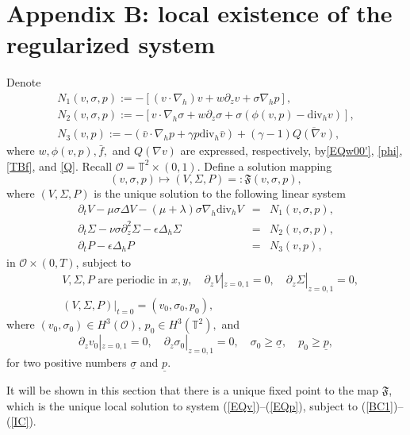 \documentclass[12pt,reqno]{amsart}
\numberwithin{equation}{section}
\begin{document}
\section{Appendix B: local existence of the regularized system}
\label{APPENDIXB}
Denote
\begin{eqnarray*}
  N_1(v,\sigma,p):=-[(v\cdot\nabla_h)v+w\partial_zv+\sigma\nabla_hp],\label{N1}\\
  N_2(v,\sigma,p):=-[v\cdot\nabla_h\sigma+w\partial_z\sigma+\sigma(\phi(v,p)-\text{div}_hv)],\label{N2}\\
  N_3(v,p):=-(\bar v\cdot\nabla_hp+\gamma p\text{div}_h\bar v)+(\gamma-1)\overline{Q(\nabla v)},\label{N3}
\end{eqnarray*}
where $w, \phi(v,p), \bar f,$ and $Q(\nabla v)$ are expressed, respectively, by\eqref{EQw00'}, \eqref{phi}, \eqref{TBf}, and \eqref{Q}.
Recall $\mathcal O=\mathbb T^2\times(0,1)$. Define a solution mapping
\begin{equation}\label{DEFF}
(v,\sigma,p)\mapsto(V,\Sigma,P)=:\mathfrak{F}(v,\sigma,p),
\end{equation}
where $(V,\Sigma,P)$ is the unique solution to the following linear system
\begin{eqnarray}
  \partial_tV-\mu\sigma\Delta V-(\mu+\lambda)\sigma\nabla_h\text{div}_hV&=&N_1(v,\sigma,p),\label{AEQV}\\
  \partial_t\Sigma-\nu\sigma\partial_z^2\Sigma-\epsilon\Delta_h\Sigma&=&N_2(v,\sigma,p),\label{AEQSIGMA}\\
  \partial_tP-\epsilon\Delta_hP&=&N_3(v,p), \label{AEQP}
\end{eqnarray}
in $\mathcal O\times(0,T)$, subject to
\begin{eqnarray}
  &V,\Sigma, P\text{ are periodic in }x,y, \quad\partial_zV|_{z=0,1}=0,\quad \partial_z\Sigma|_{z=0,1}=0,\label{ABC}\\
  &(V,\Sigma,P)|_{t=0}=(v_0,\sigma_0,p_0),\label{AIC}
\end{eqnarray}
where $(v_0,\sigma_0)\in H^3(\mathcal O)$, $p_0\in H^3(\mathbb T^2),$ and
\begin{equation*}
  \partial_zv_0|_{z=0,1}=0,\quad \partial_z\sigma_0|_{z=0,1}=0,\quad\sigma_0\geq\underline\sigma, \quad p_0\geq\underline p,\label{A1}
\end{equation*}
for two positive numbers $\underline\sigma$ and $\underline p$.

It will be shown in this section that there is a unique fixed point to the map $\mathfrak F$,
which is the unique local solution
to system (\ref{EQv})--(\ref{EQp}), subject to (\ref{BC1})--(\ref{IC}).
\end{document}
